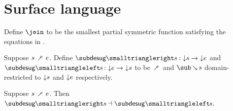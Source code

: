 \section{Surface language}
\label{sec:surface-language}






\begin{definition}
   Define $\disjjoin$ to be the smallest partial symmetric function satisfying the equations in .
\end{definition}









\begin{definition}
     Suppose $s \desugarFwdR e$. Define $\desugarFwdF{s}: \Below{s} \to \Below{e}$ and $\desugarBwdF{s}: \Below{e} \to \Below{s}$ to be $\desugarFwdR$ and $\desugarBwdR{s}$ domain-restricted to ${\downarrow}{s}$ and ${\downarrow}{e}$ respectively.
\end{definition}

\begin{theorem}
  \label{thm:surface-language:desugar:gc}
     Suppose $s \desugarFwdR e$. Then $\desugarFwdF{s} \adjoint \desugarBwdF{s}$.
\end{theorem}

